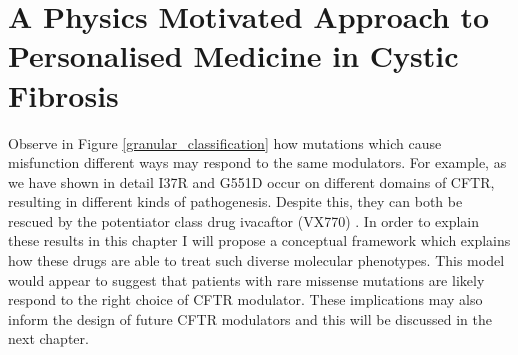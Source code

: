 \section{A Physics Motivated Approach to Personalised Medicine in Cystic Fibrosis}
Observe in Figure \ref{granular_classification} how mutations which cause misfunction different ways may respond to the same modulators. For example, as we have shown in detail I37R and G551D occur on different domains of CFTR, resulting in different kinds of pathogenesis. Despite this, they can both be rescued by the potentiator class drug ivacaftor (VX770) \cite{vangoor2014,wong2022}. In order to explain these results in this chapter I will propose a conceptual framework which explains how these drugs are able to treat such diverse molecular phenotypes. This model would appear to suggest that patients with rare missense mutations are likely respond to the right choice of CFTR modulator. These implications may also inform the design of future CFTR modulators and this will be discussed in the next chapter. 

